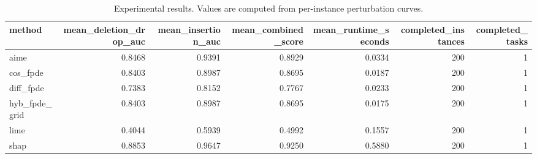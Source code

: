 \begin{table}[t]
\caption{Experimental results. Values are computed from per-instance perturbation curves.}
\label{tab:main_results_computed}
\centering
\begin{tabular}{lrrrrrr}
\toprule
method & mean\_deletion\_drop\_auc & mean\_insertion\_auc & mean\_combined\_score & mean\_runtime\_seconds & completed\_instances & completed\_tasks \\
\midrule
aime & 0.8468 & 0.9391 & 0.8929 & 0.0334 & 200 & 1 \\
cos\_fpde & 0.8403 & 0.8987 & 0.8695 & 0.0187 & 200 & 1 \\
diff\_fpde & 0.7383 & 0.8152 & 0.7767 & 0.0233 & 200 & 1 \\
hyb\_fpde\_grid & 0.8403 & 0.8987 & 0.8695 & 0.0175 & 200 & 1 \\
lime & 0.4044 & 0.5939 & 0.4992 & 0.1557 & 200 & 1 \\
shap & 0.8853 & 0.9647 & 0.9250 & 0.5880 & 200 & 1 \\
\bottomrule
\end{tabular}

\end{table}
